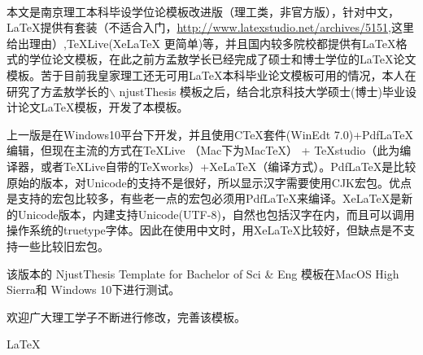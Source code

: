 


\fancyhead[LE,RO]{}
\fancyhead[RE,LO]{}
\cfoot{}
\thisfancypage{%
	\setlength{\fboxsep}{0pt}%
	\setlength{\fboxrule}{0.8pt}%
	\setlength{\shadowsize}{0pt}%
	\shadowbox}{}

\songti
\begin{spacing}{1.5}%
	\begin{center}
		\begin{minipage}[b]{0.95\linewidth}
			 \quad \\ [0.5ex]		
			 
\qquad 本文是南京理工本科毕设学位论模板改进版（理工类，非官方版），针对中文，\LaTeX 提供有\CTeX 套装（不适合入门，\url{http://www.latexstudio.net/archives/5151},这里给出理由）,TeXLive(XeLaTeX 更简单)等，并且国内较多院校都提供有\LaTeX 格式的学位论文模板，在此之前方孟敖学长已经完成了硕士和博士学位的\LaTeX 论文模板。苦于目前我皇家理工还无可用\LaTeX 本科毕业论文模板可用的情况，本人在研究了方孟敖学长的$\backslash$ njustThesis 模板之后，结合北京科技大学硕士(博士)毕业设计论文\LaTeX 模板，开发了本模板。
			
\qquad 上一版是在Windows10平台下开发，并且使用CTeX套件(WinEdt 7.0)+PdfLaTeX编辑，但现在主流的方式在TeXLive （Mac下为MacTeX） + TeXstudio（此为编译器，或者TeXLive自带的TeXworks）+XeLaTeX（编译方式）。PdfLaTeX是比较原始的版本，对Unicode的支持不是很好，所以显示汉字需要使用CJK宏包。优点是支持的宏包比较多，有些老一点的宏包必须用PdfLaTeX来编译。XeLaTeX是新的Unicode版本，内建支持Unicode(UTF-8)，自然也包括汉字在内，而且可以调用操作系统的truetype字体。因此在使用中文时，用XeLaTeX比较好，但缺点是不支持一些比较旧宏包。

\qquad 该版本的 NjustThesis Template for Bachelor of Sci \& Eng 模板在MacOS High Sierra和 Windows 10下进行测试。

\qquad 欢迎广大理工学子不断进行修改，完善该模板。
			
\vspace{8ex}
  \songti \qquad \LaTeX  \qquad \CTeX
		\end{minipage}
	\end{center}
\end{spacing}



